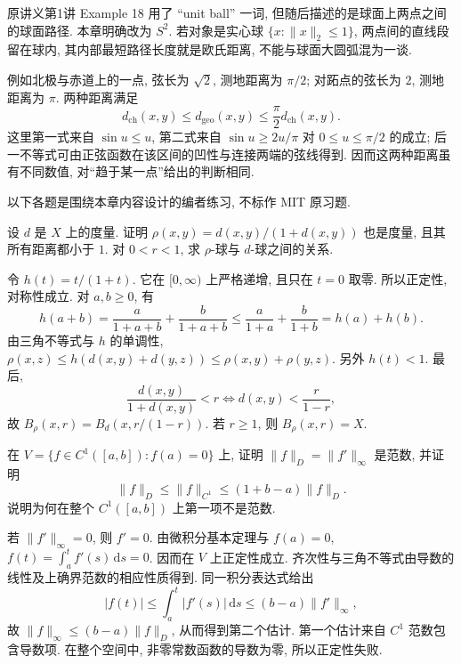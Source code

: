 \begin{remark}
原讲义第1讲 Example 18 用了 ``unit ball'' 一词, 但随后描述的是球面上两点之间的球面路径. 本章明确改为 $S^2$. 若对象是实心球 $\{x:\lVert x\rVert_2\le1\}$, 两点间的直线段留在球内, 其内部最短路径长度就是欧氏距离, 不能与球面大圆弧混为一谈.
\end{remark}

例如北极与赤道上的一点, 弦长为 $\sqrt2$, 测地距离为 $\pi/2$; 对跖点的弦长为 $2$, 测地距离为 $\pi$. 两种距离满足
\[
 d_{\mathrm{ch}}(x,y)\le d_{\mathrm{geo}}(x,y)
 \le\frac\pi2 d_{\mathrm{ch}}(x,y).
\]
这里第一式来自 $\sin u\le u$, 第二式来自 $\sin u\ge2u/\pi$ 对 $0\le u\le\pi/2$ 的成立; 后一不等式可由正弦函数在该区间的凹性与连接两端的弦线得到. 因而这两种距离虽有不同数值, 对``趋于某一点''给出的判断相同.

\label{ch:metric:exercises}
以下各题是围绕本章内容设计的编者练习, 不标作 MIT 原习题.

\begin{exercise}\label{ch:metric:ex-bounded}
设 $d$ 是 $X$ 上的度量. 证明
$\rho(x,y)=d(x,y)/(1+d(x,y))$ 也是度量, 且其所有距离都小于 $1$. 对 $0<r<1$, 求 $\rho$-球与 $d$-球之间的关系.
\end{exercise}
\begin{solution}
令 $h(t)=t/(1+t)$. 它在 $[0,\infty)$ 上严格递增, 且只在 $t=0$ 取零. 所以正定性, 对称性成立. 对 $a,b\ge0$, 有
\[
 h(a+b)=\frac{a}{1+a+b}+\frac{b}{1+a+b}
 \le\frac{a}{1+a}+\frac{b}{1+b}=h(a)+h(b).
\]
由三角不等式与 $h$ 的单调性,
$\rho(x,z)\le h(d(x,y)+d(y,z))\le\rho(x,y)+\rho(y,z)$.
另外 $h(t)<1$. 最后,
\[
 \frac{d(x,y)}{1+d(x,y)}<r
 \Longleftrightarrow d(x,y)<\frac r{1-r},
\]
故 $B_\rho(x,r)=B_d(x,r/(1-r))$. 若 $r\ge1$, 则 $B_\rho(x,r)=X$.
\end{solution}

\begin{exercise}\label{ch:metric:ex-c1}
在 $V=\{f\in C^1([a,b]):f(a)=0\}$ 上, 证明 $\lVert f\rVert_D=\lVert f'\rVert_\infty$ 是范数, 并证明
\[
 \lVert f\rVert_D\le\lVert f\rVert_{C^1}
 \le(1+b-a)\lVert f\rVert_D.
\]
说明为何在整个 $C^1([a,b])$ 上第一项不是范数.
\end{exercise}
\begin{solution}
若 $\lVert f'\rVert_\infty=0$, 则 $f'=0$. 由微积分基本定理与 $f(a)=0$,
$f(t)=\int_a^tf'(s)\,\mathrm{d}s=0$. 因而在 $V$ 上正定性成立. 齐次性与三角不等式由导数的线性及上确界范数的相应性质得到. 同一积分表达式给出
\[
 |f(t)|\le\int_a^t|f'(s)|\,\mathrm{d}s
 \le(b-a)\lVert f'\rVert_\infty,
\]
故 $\lVert f\rVert_\infty\le(b-a)\lVert f\rVert_D$, 从而得到第二个估计. 第一个估计来自 $C^1$ 范数包含导数项. 在整个空间中, 非零常数函数的导数为零, 所以正定性失败.
\end{solution}


